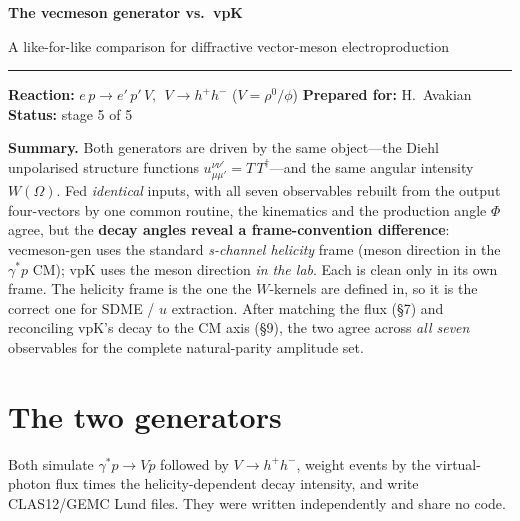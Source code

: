 \documentclass[11pt]{article}
\newcommand{\vpk}[1]{\textcolor{vpk}{#1}}
\newcommand{\ours}[1]{\textcolor{ours}{#1}}
\newcommand{\uij}[2]{u^{#1}_{#2}}
\newcommand{\shadebox}[2][shade]{%
  \begingroup\setlength{\fboxsep}{10pt}%
  \noindent\colorbox{#1}{\parbox{\dimexpr\linewidth-2\fboxsep\relax}{#2}}%
  \endgroup\par\vspace{0.6em}}
\begin{document}
{\LARGE\bfseries The \ours{vecmeson} generator vs.\ \vpk{vpK}\par}
\vspace{0.35em}
{\large A like-for-like comparison for diffractive vector-meson electroproduction\par}
\vspace{0.25em}
{\color{vpk}\rule{\linewidth}{1.2pt}}
\vspace{0.4em}

\textbf{Reaction:} $e\,p \to e'\,p'\,V,\ \ V \to h^{+}h^{-}$ \quad($V=\rho^0/\phi$)\hfill
\textbf{Prepared for:} H.\ Avakian \quad\textbf{Status:} stage 5 of 5

\vspace{0.8em}

\shadebox{\textbf{Summary.} Both generators are driven by the same object---the Diehl unpolarised
structure functions $\uij{\nu\nu'}{\mu\mu'}=T\,T^{\dagger}$---and the same angular intensity $W(\Omega)$.
Fed \emph{identical} inputs, with all seven observables rebuilt from the output four-vectors by one common
routine, the kinematics and the production angle $\Phi$ agree, but the \textbf{decay angles reveal a
frame-convention difference}: vecmeson-gen uses the standard \emph{s-channel helicity} frame (meson
direction in the $\gamma^{*}p$ CM); \vpk{vpK} uses the meson direction \emph{in the lab}. Each is clean only
in its own frame. The helicity frame is the one the $W$-kernels are defined in, so it is the correct one for
SDME / $u$ extraction. After matching the flux (\S7) and reconciling vpK's decay to the CM axis (\S9), the two
agree across \emph{all seven} observables for the complete natural-parity amplitude set.}

\section{The two generators}
Both simulate $\gamma^{*}p\to V p$ followed by $V\to h^{+}h^{-}$, weight events by the virtual-photon flux
times the helicity-dependent decay intensity, and write CLAS12/GEMC Lund files. They were written
independently and share no code.
\end{document}
